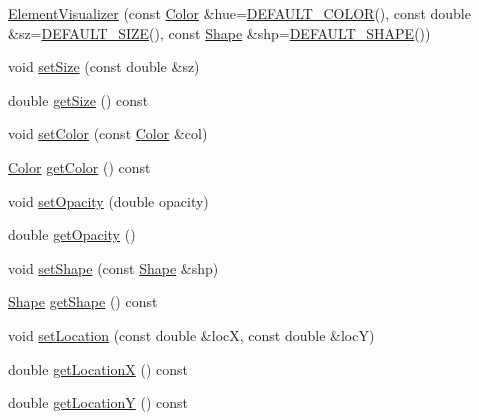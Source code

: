 \begin{DoxyCompactItemize}
\item 
\mbox{\hyperlink{classbridges_1_1_element_visualizer_addcc19a2f7fd51dcc7aebfdabb882886}{Element\+Visualizer}} (const \mbox{\hyperlink{classbridges_1_1_color}{Color}} \&hue=\mbox{\hyperlink{classbridges_1_1_element_visualizer_af86eb415ef765943472952ba49f7163d}{D\+E\+F\+A\+U\+L\+T\+\_\+\+C\+O\+L\+OR}}(), const double \&sz=\mbox{\hyperlink{classbridges_1_1_element_visualizer_a3e21ee8df1c6c3f22a8c631894344413}{D\+E\+F\+A\+U\+L\+T\+\_\+\+S\+I\+ZE}}(), const \mbox{\hyperlink{namespacebridges_a1b4050586bd708782ae0d4f3b06b9579}{Shape}} \&shp=\mbox{\hyperlink{classbridges_1_1_element_visualizer_a79c6eef0e43bdd61b9292053dfe45f29}{D\+E\+F\+A\+U\+L\+T\+\_\+\+S\+H\+A\+PE}}())
\item 
void \mbox{\hyperlink{classbridges_1_1_element_visualizer_a6fc924e754008992b310a89d8d88fce9}{set\+Size}} (const double \&sz)
\item 
double \mbox{\hyperlink{classbridges_1_1_element_visualizer_a3a1ab72360099d615ad582e5780143ad}{get\+Size}} () const
\item 
void \mbox{\hyperlink{classbridges_1_1_element_visualizer_af14723066e52c159eebfb804d65dd825}{set\+Color}} (const \mbox{\hyperlink{classbridges_1_1_color}{Color}} \&col)
\item 
\mbox{\hyperlink{classbridges_1_1_color}{Color}} \mbox{\hyperlink{classbridges_1_1_element_visualizer_a947aaebce11064225027182da9dbcea3}{get\+Color}} () const
\item 
void \mbox{\hyperlink{classbridges_1_1_element_visualizer_a8f77db4a2774021aec4ab8ea18e50fc9}{set\+Opacity}} (double opacity)
\item 
double \mbox{\hyperlink{classbridges_1_1_element_visualizer_ae806977ebc8ff1c5bce81c90b31902b5}{get\+Opacity}} ()
\item 
void \mbox{\hyperlink{classbridges_1_1_element_visualizer_af81cc20423f2fedffa81fb7c473a1179}{set\+Shape}} (const \mbox{\hyperlink{namespacebridges_a1b4050586bd708782ae0d4f3b06b9579}{Shape}} \&shp)
\item 
\mbox{\hyperlink{namespacebridges_a1b4050586bd708782ae0d4f3b06b9579}{Shape}} \mbox{\hyperlink{classbridges_1_1_element_visualizer_a2348ed705c5c6f85082e2aff11d439e7}{get\+Shape}} () const
\item 
void \mbox{\hyperlink{classbridges_1_1_element_visualizer_ad06f2fd509f6b3474feeb4fa1fef38d5}{set\+Location}} (const double \&locX, const double \&locY)
\item 
double \mbox{\hyperlink{classbridges_1_1_element_visualizer_ac944b8fb1b5b27454cf04145cb711ccc}{get\+LocationX}} () const
\item 
double \mbox{\hyperlink{classbridges_1_1_element_visualizer_a0c17d12888f98e710ed0d5ab6e142f8e}{get\+LocationY}} () const
\end{DoxyCompactItemize}

